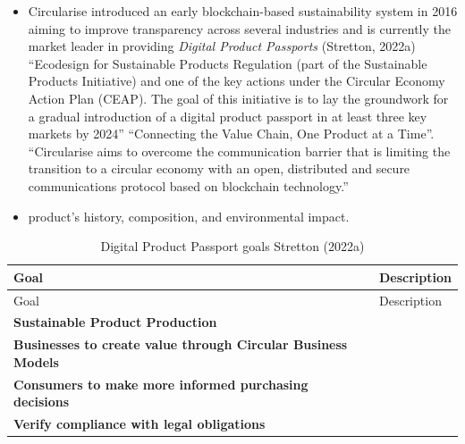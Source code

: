 \documentclass[
  letterpaper,
  DIV=11,
  numbers=noendperiod]{scrartcl}
\providecommand{\tightlist}{%
  \setlength{\itemsep}{0pt}\setlength{\parskip}{0pt}}\usepackage{longtable,booktabs,array}
\begin{document}
\begin{itemize}
\tightlist
\item
  Circularise introduced an early blockchain-based sustainability system
  in 2016 aiming to improve transparency across several industries and
  is currently the market leader in providing \emph{Digital Product
  Passports} (Stretton, 2022a) ``Ecodesign for Sustainable Products
  Regulation (part of the Sustainable Products Initiative) and one of
  the key actions under the Circular Economy Action Plan (CEAP). The
  goal of this initiative is to lay the groundwork for a gradual
  introduction of a digital product passport in at least three key
  markets by 2024'' ``Connecting the Value Chain, One Product at a
  Time''. ``Circularise aims to overcome the communication barrier that
  is limiting the transition to a circular economy with an open,
  distributed and secure communications protocol based on blockchain
  technology.''
\item
  product's history, composition, and environmental impact.
\end{itemize}

\begin{longtable}[]{@{}
  >{\raggedright\arraybackslash}p{}
  >{\raggedright\arraybackslash}p{}@{}}
\caption{Digital Product Passport goals Stretton (2022a)}\tabularnewline
\toprule\noalign{}
\begin{minipage}[b]{\linewidth}\raggedright
Goal
\end{minipage} & \begin{minipage}[b]{\linewidth}\raggedright
Description
\end{minipage} \\
\midrule\noalign{}
\endfirsthead
\toprule\noalign{}
\begin{minipage}[b]{\linewidth}\raggedright
Goal
\end{minipage} & \begin{minipage}[b]{\linewidth}\raggedright
Description
\end{minipage} \\
\midrule\noalign{}
\endhead
\bottomrule\noalign{}
\endlastfoot
\textbf{Sustainable Product Production} & \\
\textbf{Businesses to create value through Circular Business Models}
& \\
\textbf{Consumers to make more informed purchasing decisions} & \\
\textbf{Verify compliance with legal obligations} & \\
\end{longtable}
\end{document}

